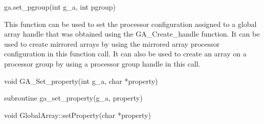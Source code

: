 \documentclass[12pt]{article}
\begin{document}
\begin{pyapi}
\begin{pycode}
ga.set_pgroup(int g_a, int pgroup)
\end{pycode}
\begin{funcargs}
\end{funcargs}
\end{pyapi}

\gcoll

\begin{desc}

This function can be used to set the processor configuration assigned to a
global array handle that was obtained using the GA_Create_handle function. It
can be used to create mirrored arrays by using the mirrored array processor
configuration in this function call. It can also be used to create an array on
a processor group by using a processor group handle in this call.

\end{desc}



\begin{capi}
\begin{ccode}
void GA_Set_property(int g_a, char *property)
\end{ccode}
\begin{funcargs}
\end{funcargs}
\end{capi}

\begin{fapi}
\begin{fcode}
subroutine ga_set_property(g_a, property)
\end{fcode}
\begin{funcargs}
\end{funcargs}
\end{fapi}

\begin{cxxapi}
\begin{cxxcode}
void GlobalArray::setProperty(char *property)
\end{cxxcode}
\begin{funcargs}
\end{funcargs}
\end{cxxapi}
\end{document}
